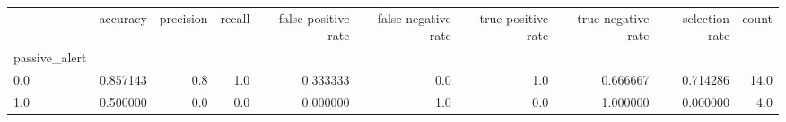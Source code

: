 \begin{tabular}{lrrrrrrrrr}
\toprule
{} &  accuracy &  precision &  recall &  false positive rate &  false negative rate &  true positive rate &  true negative rate &  selection rate &  count \\
passive\_alert &           &            &         &                      &                      &                     &                     &                 &        \\
\midrule
0.0           &  0.857143 &        0.8 &     1.0 &             0.333333 &                  0.0 &                 1.0 &            0.666667 &        0.714286 &   14.0 \\
1.0           &  0.500000 &        0.0 &     0.0 &             0.000000 &                  1.0 &                 0.0 &            1.000000 &        0.000000 &    4.0 \\
\bottomrule
\end{tabular}
